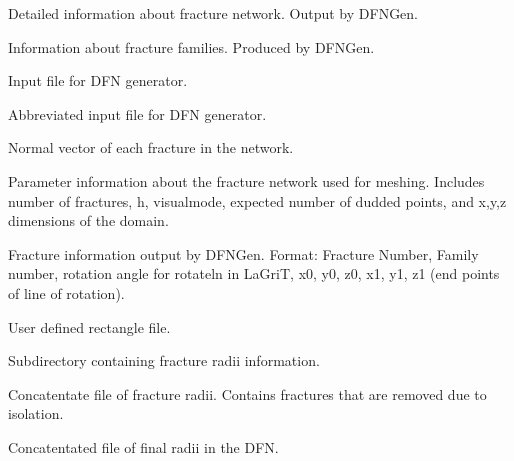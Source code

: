\documentclass[letterpaper,10pt,english]{sphinxmanual}
\begin{document}
\label{\detokenize{output:dfn-output-txt}}
Detailed information about fracture network. Output by DFNGen.


\label{\detokenize{output:families-dat}}
Information about fracture families. Produced by DFNGen.


\label{\detokenize{output:input-generator-dat}}
Input file for DFN generator.


\label{\detokenize{output:input-generator-clean-dat}}
Abbreviated input file for DFN generator.


\label{\detokenize{output:normal-vectors-dat}}
Normal vector of each fracture in the network.


\label{\detokenize{output:params-txt}}
Parameter information about the fracture network used for meshing. Includes number of fractures, h, visualmode, expected number of dudded points, and x,y,z dimensions of the domain.


\label{\detokenize{output:poly-info-dat}}
Fracture information output by DFNGen. Format: Fracture Number, Family number, rotation angle for rotateln in LaGriT, x0, y0, z0, x1, y1, z1 (end points of line of rotation).


\label{\detokenize{output:user-rects-dat}}
User defined rectangle file.


\label{\detokenize{output:radii}}
Subdirectory containing fracture radii information.


\label{\detokenize{output:radii-dat}}
Concatentate file of fracture radii. Contains fractures that are removed due to isolation.


\label{\detokenize{output:radii-final-dat}}
Concatentated file of final radii in the DFN.
\end{document}
